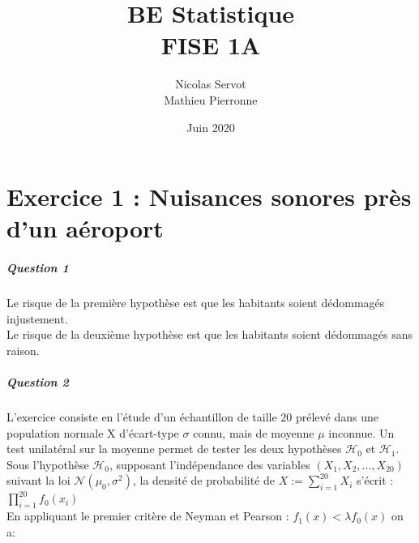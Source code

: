 \documentclass[oneside,a4paper,13pt]{book}
\begin{document}
\title{%
	BE Statistique \\ 
	\large FISE 1A}
\author{Nicolas Servot \\ Mathieu Pierronne}
\date{Juin 2020}

\maketitle



\chapter*{Exercice 1 : Nuisances sonores près d'un aéroport}

\paragraph{Question 1}

Le risque de la première hypothèse est que les habitants soient dédommagés injustement. \\
Le risque de la deuxième hypothèse est que les habitants soient dédommagés sans raison.

\paragraph{Question 2}

L'exercice consiste en l'étude d'un échantillon de taille 20 prélevé dans une population normale X d'écart-type $\sigma$ connu, mais de moyenne $\mu$ inconnue. Un test unilatéral sur la moyenne permet de tester les deux hypothèses $\mathcal{H}_{0}$ et $\mathcal{H}_{1}$. \\ 

 Sous l'hypothèse $\mathcal{H}_{0}$, supposant l'indépendance des variables $(X_{1},X_{2},...,X_{20})$ suivant la loi $\mathcal{N}(\mu_{0},\sigma^2)$, la densité de probabilité de $X := \sum_{i=1}^{20} X_{i}$ s'écrit : $\prod_{i=1}^{20} f_{0}(x_{i})$ \\

En appliquant le premier critère de Neyman et Pearson : $f_{1}(x)<\lambda f_{0}(x)$ on a:
\end{document}
